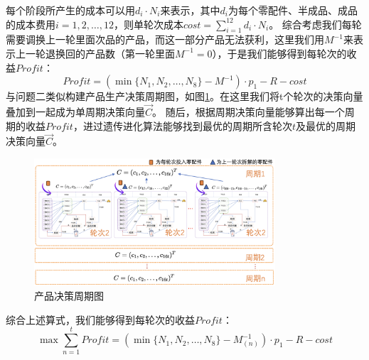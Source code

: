 \documentclass[withoutpreface,bwprint]{cumcmthesis} %
\begin{document}
		每个阶段所产生的成本可以用$d_{i}\cdot N_{i}$来表示，其中$d_{i}$为每个零配件、半成品、成品的成本费用$i=1,2,\dots,12$，则单轮次成本$cost = \sum_{i=1}^{12}d_{i}\cdot N_{i}$。
		综合考虑我们每轮需要调换上一轮里面次品的产品，而这一部分产品无法获利，这里我们用$M^{-1}$来表示上一轮退换回的产品数（第一轮里面$M^{-1}=0$），于是我们能够得到每轮次的收益$Profit$：
		\begin{equation}
			\textit{Profit}=(\min \{N_{1},N_{2},\dots,N_{8}\}-M^{-1})\cdot p_{1}-R-cost
			\label{eq:12}
		\end{equation}
		与问题二类似构建产品生产决策周期图，如图\ref{fig:pro3-2}。在这里我们将t个轮次的决策向量叠加到一起成为单周期决策向量$\vec{C}$。
		随后，根据周期决策向量能够算出每一个周期的收益$Profit$，进过遗传进化算法能够找到最优的周期所含轮次$t$及最优的周期决策向量$\vec{C}$。
		\begin{figure}[H]
			\centering
			\includegraphics[width=0.8\textwidth]{Fig/pro3-2.png}
			\caption{产品决策周期图}
			\label{fig:pro3-2}
		\end{figure}
		综合上述算式，我们能够得到每轮次的收益$Profit$：
$$\max	\sum_{n=1}^{t}\textit{Profit}=(\min \{N_{1},N_{2},\dots,N_{8}\}-M_{(n)}^{-1})\cdot p_{1}-R-cost$$
\end{document}
